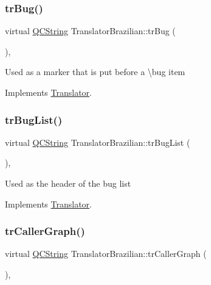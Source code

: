 \subsubsection{\texorpdfstring{trBug()}{trBug()}}
{\footnotesize\ttfamily virtual \mbox{\hyperlink{class_q_c_string}{Q\+C\+String}} Translator\+Brazilian\+::tr\+Bug (\begin{DoxyParamCaption}{ }\end{DoxyParamCaption})\hspace{0.3cm}{\ttfamily [inline]}, {\ttfamily [virtual]}}

Used as a marker that is put before a \textbackslash{}bug item 

Implements \mbox{\hyperlink{class_translator}{Translator}}.

\mbox{\label{class_translator_brazilian_ab7f34dfd85ec4a352ac8deda3feef2d0}} 
\subsubsection{\texorpdfstring{trBugList()}{trBugList()}}
{\footnotesize\ttfamily virtual \mbox{\hyperlink{class_q_c_string}{Q\+C\+String}} Translator\+Brazilian\+::tr\+Bug\+List (\begin{DoxyParamCaption}{ }\end{DoxyParamCaption})\hspace{0.3cm}{\ttfamily [inline]}, {\ttfamily [virtual]}}

Used as the header of the bug list 

Implements \mbox{\hyperlink{class_translator}{Translator}}.

\mbox{\label{class_translator_brazilian_a96563cbafa55d8e1879fb8d9b3dcb11c}} 
\subsubsection{\texorpdfstring{trCallerGraph()}{trCallerGraph()}}
{\footnotesize\ttfamily virtual \mbox{\hyperlink{class_q_c_string}{Q\+C\+String}} Translator\+Brazilian\+::tr\+Caller\+Graph (\begin{DoxyParamCaption}{ }\end{DoxyParamCaption})\hspace{0.3cm}{\ttfamily [inline]}, {\ttfamily [virtual]}}

